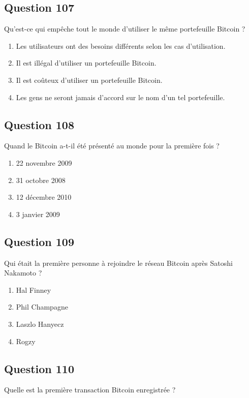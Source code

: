 \documentclass[12pt,a4paper]{article}
\begin{document}
\bigskip


\subsection*{Question 107}
Qu'est-ce qui empêche tout le monde d'utiliser le même portefeuille Bitcoin ?

\begin{enumerate}[label=\Alph*., leftmargin=*]
\item Les utilisateurs ont des besoins différents selon les cas d'utilisation.
\item Il est illégal d'utiliser un portefeuille Bitcoin.
\item Il est coûteux d'utiliser un portefeuille Bitcoin.
\item Les gens ne seront jamais d'accord sur le nom d'un tel portefeuille.
\end{enumerate}

\bigskip


\subsection*{Question 108}
Quand le Bitcoin a-t-il été présenté au monde pour la première fois ?

\begin{enumerate}[label=\Alph*., leftmargin=*]
\item 22 novembre 2009
\item 31 octobre 2008
\item 12 décembre 2010
\item 3 janvier 2009
\end{enumerate}

\bigskip


\subsection*{Question 109}
Qui était la première personne à rejoindre le réseau Bitcoin après Satoshi Nakamoto ?

\begin{enumerate}[label=\Alph*., leftmargin=*]
\item Hal Finney
\item Phil Champagne
\item Laszlo Hanyecz
\item Rogzy
\end{enumerate}

\bigskip


\subsection*{Question 110}
Quelle est la première transaction Bitcoin enregistrée ?
\end{document}
